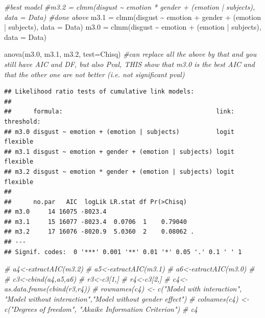 \documentclass[
]{article}
\newenvironment{Shaded}{\begin{snugshade}}{\end{snugshade}}
\newcommand{\AttributeTok}[1]{\textcolor[rgb]{0.77,0.63,0.00}{#1}}
\newcommand{\CommentTok}[1]{\textcolor[rgb]{0.56,0.35,0.01}{\textit{#1}}}
\newcommand{\FloatTok}[1]{\textcolor[rgb]{0.00,0.00,0.81}{#1}}
\newcommand{\FunctionTok}[1]{\textcolor[rgb]{0.00,0.00,0.00}{#1}}
\newcommand{\NormalTok}[1]{#1}
\newcommand{\OtherTok}[1]{\textcolor[rgb]{0.56,0.35,0.01}{#1}}
\newcommand{\SpecialCharTok}[1]{\textcolor[rgb]{0.00,0.00,0.00}{#1}}
\newcommand{\StringTok}[1]{\textcolor[rgb]{0.31,0.60,0.02}{#1}}
\begin{document}
\begin{Shaded}
\begin{Highlighting}[]
\CommentTok{\#best model}
\CommentTok{\#m3.2 = clmm(disgust \textasciitilde{} emotion * gender + (emotion | subjects), data = Data) \#done above}
\NormalTok{m3}\FloatTok{.1} \OtherTok{=} \FunctionTok{clmm}\NormalTok{(disgust }\SpecialCharTok{\textasciitilde{}}\NormalTok{ emotion }\SpecialCharTok{+}\NormalTok{ gender }\SpecialCharTok{+}\NormalTok{ (emotion }\SpecialCharTok{|}\NormalTok{ subjects), }\AttributeTok{data =}\NormalTok{ Data)}
\NormalTok{m3}\FloatTok{.0} \OtherTok{=} \FunctionTok{clmm}\NormalTok{(disgust }\SpecialCharTok{\textasciitilde{}}\NormalTok{ emotion }\SpecialCharTok{+}\NormalTok{ (emotion }\SpecialCharTok{|}\NormalTok{ subjects), }\AttributeTok{data =}\NormalTok{ Data)}


\FunctionTok{anova}\NormalTok{(m3}\FloatTok{.0}\NormalTok{, m3}\FloatTok{.1}\NormalTok{, m3}\FloatTok{.2}\NormalTok{, }\AttributeTok{test=}\StringTok{\textquotesingle{}Chisq\textquotesingle{}}\NormalTok{) }\CommentTok{\#can replace all the above by that and you still have AIC and DF, but also Pval, THIS show that m3.0 is the best AIC and that the other one are not better (i.e. not significant pval)}
\end{Highlighting}
\end{Shaded}

\begin{verbatim}
## Likelihood ratio tests of cumulative link models:
##  
##      formula:                                          link: threshold:
## m3.0 disgust ~ emotion + (emotion | subjects)          logit flexible  
## m3.1 disgust ~ emotion + gender + (emotion | subjects) logit flexible  
## m3.2 disgust ~ emotion * gender + (emotion | subjects) logit flexible  
## 
##      no.par   AIC  logLik LR.stat df Pr(>Chisq)  
## m3.0     14 16075 -8023.4                        
## m3.1     15 16077 -8023.4  0.0706  1    0.79040  
## m3.2     17 16076 -8020.9  5.0360  2    0.08062 .
## ---
## Signif. codes:  0 '***' 0.001 '**' 0.01 '*' 0.05 '.' 0.1 ' ' 1
\end{verbatim}

\begin{Shaded}
\begin{Highlighting}[]
\CommentTok{\# a4\textless{}{-}extractAIC(m3.2)}
\CommentTok{\# a5\textless{}{-}extractAIC(m3.1)}
\CommentTok{\# a6\textless{}{-}extractAIC(m3.0)}
\CommentTok{\# }
\CommentTok{\# c3\textless{}{-}cbind(a4,a5,a6)}
\CommentTok{\# r3\textless{}{-}c3[1,]}
\CommentTok{\# r4\textless{}{-}c3[2,]}
\CommentTok{\# c4\textless{}{-}as.data.frame(cbind(r3,r4))}
\CommentTok{\# rownames(c4) \textless{}{-} c("Model with interaction", "Model without interaction","Model without gender effect")}
\CommentTok{\# colnames(c4) \textless{}{-} c("Degrees of freedom", "Akaike Information Criterion")}
\CommentTok{\# c4}
\end{Highlighting}
\end{Shaded}
\end{document}
